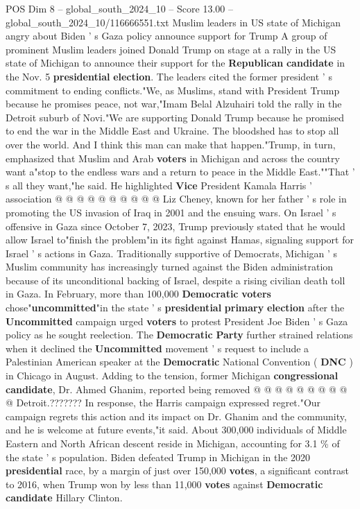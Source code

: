 \begin{textsample}{POS Dim 8 – global\_south\_2024\_10 – Score 13.00 – global\_south\_2024\_10/116666551.txt}  \label{ex:f8_pos_261}
Muslim leaders in US state of Michigan angry about Biden ' s Gaza policy announce support for Trump A group of prominent Muslim leaders joined Donald Trump on stage at a rally in the US state of Michigan to announce their support for the \textbf{Republican} \textbf{candidate} in the Nov. 5 \textbf{presidential} \textbf{election}.
The leaders cited the former president ' s commitment to ending conflicts."We, as Muslims, stand with President Trump because he promises peace, not war,"Imam Belal Alzuhairi told the rally in the Detroit suburb of Novi."We are supporting Donald Trump because he promised to end the war in the Middle East and Ukraine.
The bloodshed has to stop all over the world.
And I think this man can make that happen."Trump, in turn, emphasized that Muslim and Arab \textbf{voters} in Michigan and across the country want a"stop to the endless wars and a return to peace in the Middle East.""That ' s all they want,"he said.
He highlighted \textbf{Vice} President Kamala Harris ' association @ @ @ @ @ @ @ @ @ @ Liz Cheney, known for her father ' s role in promoting the US invasion of Iraq in 2001 and the ensuing wars.
On Israel ' s offensive in Gaza since October 7, 2023, Trump previously stated that he would allow Israel to"finish the problem"in its fight against Hamas, signaling support for Israel ' s actions in Gaza.
Traditionally supportive of Democrats, Michigan ' s Muslim community has increasingly turned against the Biden administration because of its unconditional backing of Israel, despite a rising civilian death toll in Gaza.
In February, more than 100,000 \textbf{Democratic} \textbf{voters} chose"\textbf{uncommitted}"in the state ' s \textbf{presidential} \textbf{primary} \textbf{election} after the \textbf{Uncommitted} campaign urged \textbf{voters} to protest President Joe Biden ' s Gaza policy as he sought reelection.
The \textbf{Democratic} \textbf{Party} further strained relations when it declined the \textbf{Uncommitted} movement ' s request to include a Palestinian American speaker at the \textbf{Democratic} National Convention ( \textbf{DNC} ) in Chicago in August.
Adding to the tension, former Michigan \textbf{congressional} \textbf{candidate}, Dr.
Ahmed Ghanim, reported being removed @ @ @ @ @ @ @ @ @ @ Detroit.???????
In response, the Harris campaign expressed regret."Our campaign regrets this action and its impact on Dr.
Ghanim and the community, and he is welcome at future events,"it said.
About 300,000 individuals of Middle Eastern and North African descent reside in Michigan, accounting for 3.1 \% of the state ' s population.
Biden defeated Trump in Michigan in the 2020 \textbf{presidential} race, by a margin of just over 150,000 \textbf{votes}, a significant contrast to 2016, when Trump won by less than 11,000 \textbf{votes} against \textbf{Democratic} \textbf{candidate} Hillary Clinton.

\end{textsample}
